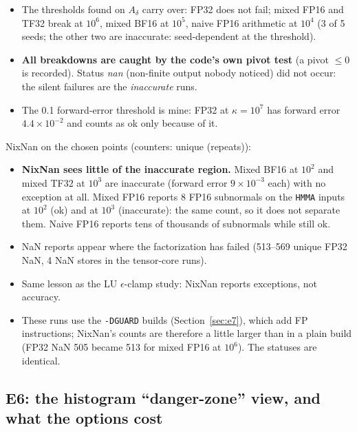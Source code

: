 \documentclass[11pt,a4paper]{article}
\begin{document}
\begin{center}\scriptsize\end{center}

\begin{itemize}
  \item The thresholds found on $A_\delta$ carry over: FP32 does not fail; mixed FP16 and TF32 break at $10^{6}$, mixed BF16 at $10^{5}$, naive FP16 arithmetic at $10^{4}$ (3 of 5 seeds; the other two are inaccurate: seed-dependent at the threshold).
  \item \textbf{All breakdowns are caught by the code's own pivot test} (a pivot $\le0$ is recorded). Status \emph{nan} (non-finite output nobody noticed) did not occur: the silent failures are the \emph{inaccurate} runs.
  \item The 0.1 forward-error threshold is mine: FP32 at $\kappa=10^{7}$ has forward error $4.4\times10^{-2}$ and counts as ok only because of it.
\end{itemize}

NixNan on the chosen points (counters: unique (repeats)):

\begin{center}\scriptsize\end{center}

\begin{itemize}
  \item \textbf{NixNan sees little of the inaccurate region.} Mixed BF16 at $10^{2}$ and mixed TF32 at $10^{3}$ are inaccurate (forward error $9\times10^{-3}$ each) with no exception at all. Mixed FP16 reports 8 FP16 subnormals on the \texttt{HMMA} inputs at $10^{2}$ (ok) and at $10^{3}$ (inaccurate): the same count, so it does not separate them. Naive FP16 reports tens of thousands of subnormals while still ok.
  \item NaN reports appear where the factorization has failed (513--569 unique FP32 NaN, 4 NaN stores in the tensor-core runs).
  \item Same lesson as the LU $\epsilon$-clamp study: NixNan reports exceptions, not accuracy.
  \item These runs use the \texttt{-DGUARD} builds (Section~\ref{sec:e7}), which add FP instructions; NixNan's counts are therefore a little larger than in a plain build (FP32 NaN 505 became 513 for mixed FP16 at $10^{6}$). The statuses are identical.
\end{itemize}

\subsection{E6: the histogram ``danger-zone'' view, and what the options cost}\label{sec:e6}
\end{document}
